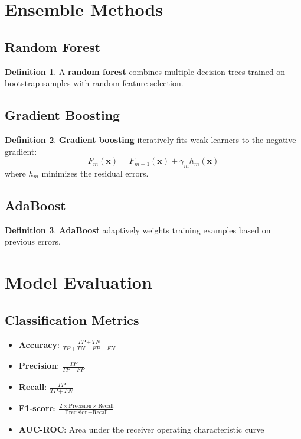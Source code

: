 \documentclass[11pt]{article}
\theoremstyle{definition}
\newtheorem{definition}{Definition}[section]
\begin{document}
\section{Ensemble Methods}

\subsection{Random Forest}
\begin{definition}
A \textbf{random forest} combines multiple decision trees trained on bootstrap samples with random feature selection.
\end{definition}

\subsection{Gradient Boosting}
\begin{definition}
\textbf{Gradient boosting} iteratively fits weak learners to the negative gradient:
$$F_m(\mathbf{x}) = F_{m-1}(\mathbf{x}) + \gamma_m h_m(\mathbf{x})$$
where $h_m$ minimizes the residual errors.
\end{definition}

\subsection{AdaBoost}
\begin{definition}
\textbf{AdaBoost} adaptively weights training examples based on previous errors.
\end{definition}

\section{Model Evaluation}

\subsection{Classification Metrics}
\begin{itemize}
    \item \textbf{Accuracy}: $\frac{TP + TN}{TP + TN + FP + FN}$
    \item \textbf{Precision}: $\frac{TP}{TP + FP}$
    \item \textbf{Recall}: $\frac{TP}{TP + FN}$
    \item \textbf{F1-score}: $\frac{2 \times \text{Precision} \times \text{Recall}}{\text{Precision} + \text{Recall}}$
    \item \textbf{AUC-ROC}: Area under the receiver operating characteristic curve
\end{itemize}
\end{document}
